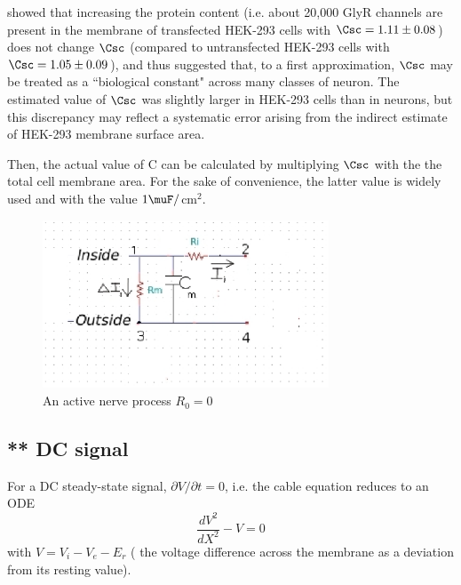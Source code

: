 \citep{gentet2008} showed that increasing the protein content (i.e. about 20,000
GlyR channels are present in the membrane of transfected HEK-293 cells with
$\Csc = 1.11\pm 0.08$) does not change $\Csc$ (compared to untransfected HEK-293
cells with $\Csc = 1.05\pm 0.09$), and thus suggested that, to a first
approximation, $\Csc$ may be treated as a ``biological constant" across many
classes of neuron.
The estimated value of $\Csc$ was slightly larger in HEK-293 cells than in
neurons, but this discrepancy may reflect a systematic error arising from the
indirect estimate of HEK-293 membrane surface area.

Then, the actual value of C can be calculated by multiplying $\Csc$ with the the
total cell membrane area. For the sake of convenience, the latter value is
widely used and with the value $1\muF/$cm$^2$.





\begin{figure}[htb]
\centerline{\includegraphics[height=5cm]{./images/membrane-circuit-2.eps}}
\caption{An active nerve process $R_0 = 0$}\label{fig:circuit2}
\end{figure}


\subsection{** DC signal}

For a DC steady-state signal, $\partial V/\partial t = 0$, i.e. the cable
equation reduces to an ODE
\begin{equation}
\frac{dV^2}{dX^2} - V = 0
\end{equation}
with $V = V_i - V_e - E_r$ ( the voltage difference across the membrane as a
deviation from its resting value).

